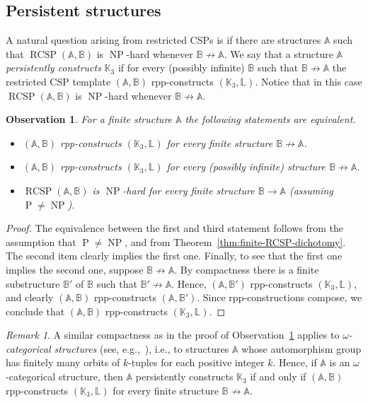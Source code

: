 \documentclass{article}
\newtheorem{observation}[theorem]{Observation}
\theoremstyle{definition}
\theoremstyle{remark}
\newtheorem{remark}[theorem]{Remark}
\DeclareMathOperator{\NP}{NP}
\DeclareMathOperator{\cP}{P}
\DeclareMathOperator{\RCSP}{RCSP}
\newcommand{\bA}{{\mathbb A}}
\newcommand{\bB}{{\mathbb B}}
\newcommand{\bK}{{\mathbb K}}
\newcommand{\bL}{{\mathbb L}}
\begin{document}
\subsection*{Persistent structures}

A natural question arising from restricted CSPs is if there are structures $\bA$ such that
$\RCSP(\bA,\bB)$ is $\NP$-hard whenever $\bB\not\to \bA$. We say that a structure $\bA$
\emph{persistently constructs} $\bK_3$ if for every (possibly infinite) $\bB$ such
that $\bB\not\to\bA$ the restricted CSP template $(\bA,\bB)$ rpp-constructs $(\bK_3,\bL)$.
Notice that in this case $\RCSP(\bA,\bB)$ is $\NP$-hard whenever $\bB\not\to \bA$.

\begin{observation}\label{obs:persistent}
    For a finite structure $\bA$ the following statements are equivalent.
    \begin{itemize}
        \item $(\bA,\bB)$ rpp-constructs $(\bK_3,\bL)$ for every finite structure $\bB\not\to \bA$.
        \item $(\bA,\bB)$ rpp-constructs $(\bK_3,\bL)$ for every (possibly infinite) structure $\bB\not\to \bA$.
        \item $\RCSP(\bA,\bB)$ is $\NP$-hard for every finite structure $\bB\to \bA$ (assuming $\cP\neq \NP$).
    \end{itemize}
\end{observation}
\begin{proof}
    The equivalence between the first and third statement follows from the assumption that $\cP\neq \NP$,
    and from Theorem~\ref{thm:finite-RCSP-dichotomy}. The second item clearly implies the first one. Finally,
    to see that the first one implies the second one, suppose $\bB\not\to \bA$. By compactness
    there is a finite substructure $\bB'$ of $\bB$ such that $\bB'\not\to\bA$. Hence, $(\bA,\bB')$
    rpp-constructs $(\bK_3,\bL)$, and clearly $(\bA,\bB)$ rpp-constructs $(\bA,\bB')$. Since rpp-constructions
    compose, we conclude that $(\bA,\bB)$ rpp-constructs $(\bK_3,\bL)$. 
\end{proof}

\begin{remark}
    A similar compactness as in the proof of Observation~\ref{obs:persistent} applies to
    \emph{$\omega$-categorical structures} (see, e.g.,~\cite[Lemma 4.1.7]{Book}), i.e.,
    to structures $\bA$ whose automorphism group has finitely many orbits of $k$-tuples for
    each positive integer $k$. Hence, if $\bA$ is an $\omega$-categorical structure,
    then $\bA$ persistently constructs $\bK_3$ if and only if $(\bA,\bB)$ rpp-constructs
    $(\bK_3,\bL)$ for every finite structure $\bB\not\to \bA$.
\end{remark}
\end{document}
